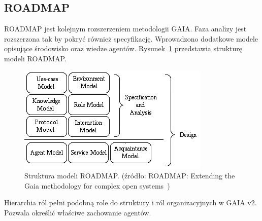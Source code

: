 \documentclass[11pt]{report}
\begin{document}
    \subsection{ROADMAP}
    ROADMAP jest kolejnym rozszerzeniem metodologii GAIA.
    Faza analizy jest rozszerzona tak by pokryć również specyfikację.
    Wprowadzono dodatkowe modele opisujące środowisko oraz wiedze agentów.
    Rysunek~\ref{fig:roadmap} przedstawia strukturę modeli ROADMAP.
    \begin{figure}[!ht]
        \centering
        \includegraphics[width=\linewidth]{fig/roadmap models.png}
        \caption{Struktura modeli ROADMAP. (źródło: ROADMAP: Extending the Gaia methodology for complex open systems~\cite{Juan2002a})}
        \label{fig:roadmap}
    \end{figure}
    Hierarchia ról pełni podobną role do struktury i ról organizacyjnych w GAIA v2.
    Pozwala określić właściwe zachowanie agentów.
\end{document}

